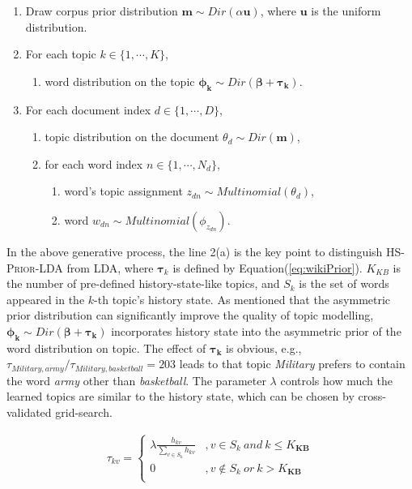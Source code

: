\documentclass[runningheads,a4paper]{llncs}
\begin{document}
\begin{enumerate}[itemsep=0mm]
\item Draw corpus prior distribution \(\bm{m} \sim Dir(\alpha \bm{u})\), where \(\bm{u}\) is the uniform distribution.
\item For each topic \(k \in \{1,\cdots,K\}\), 
\begin{enumerate}[itemsep=0mm]
\item word distribution on the topic \(\bm{\phi_k} \sim Dir(\bm{\beta}+ \bm{\tau_k})\).
\end{enumerate}
\item For each document index \(d \in \{1,\cdots,D\}\),
\begin{enumerate}[itemsep=0mm]
\item topic distribution on the document \(\theta_d \sim Dir(\bm{m})\),
\item for each word index \(n \in \{1,\cdots,N_d\}\),
\begin{enumerate}[itemsep=0mm]
\item word's topic assignment \(z_{dn} \sim Multinomial(\theta_d)\), 
\item word \(w_{dn} \sim Multinomial(\phi_{z_{dn}})\). 
\end{enumerate}
\end{enumerate}

\end{enumerate}

In the above generative process, the line 2(a) is the key point to distinguish \textsc{HS-Prior-LDA} from LDA\cite{blei2003latent}, where \(\bm{\tau}_k\) is defined by Equation(\ref{eq:wikiPrior}).
\(K_{KB}\) is the number of pre-defined history-state-like topics, and \(S_k\) is the set of words appeared in the \(k\)-th topic's history state.
As \cite{wallach2008structured} mentioned that the asymmetric prior distribution can significantly improve the quality of topic modelling, \(\bm{\phi_k} \sim Dir(\bm{\beta}+ \bm{\tau_k})\) incorporates history state into the asymmetric prior of the word distribution on topic. 
The effect of \(\bm{\tau_k}\) is obvious, e.g., \(\tau_{Military,army}/\tau_{Military,basketball}=203\) leads to that topic \textit{Military} prefers to contain the word \textit{army} other than \textit{basketball}.
The parameter \(\lambda\) controls how much the learned topics are similar to the history state, which can be chosen by cross-validated grid-search. 

\begin{scriptsize}
\begin{equation}
\label{eq:wikiPrior}
\begin{aligned}
\tau_{kv}=
\left\{ \begin{aligned}
\lambda \frac{h_{kv}}{\sum_{v\in S_{k}}h_{kv}} &,v\in S_{k}\ and  \ k \leq K_{\bm{KB}} \\
0&,v \notin S_{k} \ or \ k > K_{\bm{KB}} \\
\end{aligned}\right.
\end{aligned}
\end{equation}
\end{scriptsize}
\end{document}
